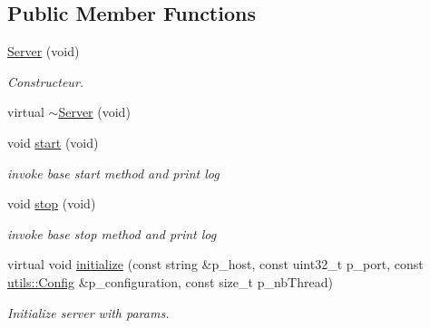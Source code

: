 \subsection*{Public Member Functions}
\begin{DoxyCompactItemize}
\item 
\hyperlink{classxtd_1_1network_1_1bip_1_1Server_ab4c6f8f28b5d56b69c575a6dc1be30b4}{Server} (void)
\begin{DoxyCompactList}\small\item\em Constructeur. \end{DoxyCompactList}\item 
virtual \hyperlink{classxtd_1_1network_1_1bip_1_1Server_a9731cfd5eda9f51604b9b0195acfb208}{$\sim$\-Server} (void)
\item 
void \hyperlink{classxtd_1_1network_1_1bip_1_1Server_aaa19f560d98c05518caa68bf94c36b91}{start} (void)
\begin{DoxyCompactList}\small\item\em invoke base start method and print log \end{DoxyCompactList}\item 
void \hyperlink{classxtd_1_1network_1_1bip_1_1Server_a12041b5218057930724c15e83c478c50}{stop} (void)
\begin{DoxyCompactList}\small\item\em invoke base stop method and print log \end{DoxyCompactList}\item 
virtual void \hyperlink{classxtd_1_1network_1_1bip_1_1Server_a3ba1e98abbe7516f5ec02b2ac9031e3c}{initialize} (const string \&p\-\_\-host, const uint32\-\_\-t p\-\_\-port, const \hyperlink{classxtd_1_1network_1_1utils_1_1Config}{utils\-::\-Config} \&p\-\_\-configuration, const size\-\_\-t p\-\_\-nb\-Thread)
\begin{DoxyCompactList}\small\item\em Initialize server with params. \end{DoxyCompactList}\end{DoxyCompactItemize}
